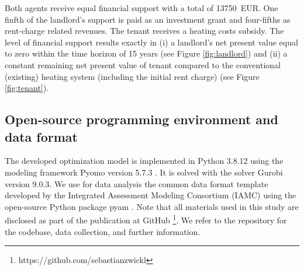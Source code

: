 Both agents receive equal financial support with a total of \SI{13750}{EUR}. One finfth of the landlord's support is paid as an investment grant and four-fifths as rent-charge related revenues. The tenant receives a heating costs subsidy. The level of financial support results exactly in (i) a landlord's net present value equal to zero within the time horizon of 15 years (see Figure \ref{fig:landlord}) and (ii) a constant remaining net present value of tenant compared to the conventional (existing) heating system (including the initial rent charge) (see Figure \ref{fig:tenant}). 

\subsection{Open-source programming environment and data format}\label{met:os}
The developed optimization model is implemented in Python 3.8.12 using the modeling framework Pyomo version 5.7.3 \cite{hart2017optimization}. It is solved with the solver Gurobi version 9.0.3. We use for data analysis the common data format template developed by the Integrated Assessment Modeling Consortium (IAMC) using the open-source Python package pyam \cite{huppmann2021pyam}. Note that all materials used in this study are disclosed as part of the publication at GitHub \footnote{https://github.com/sebastianzwickl}. We refer to the repository for the codebase, data collection, and further information. 